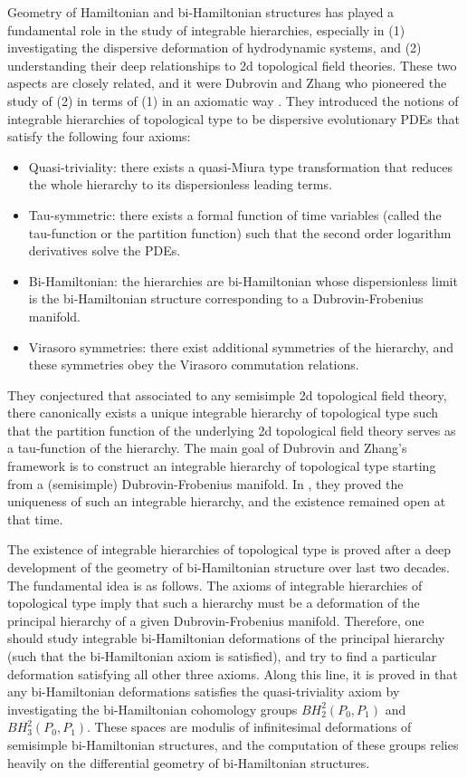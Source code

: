 \documentclass[11pt,a4paper]{amsart}
\numberwithin{equation}{section}
\numberwithin{equation}{section}
\begin{document}
Geometry of Hamiltonian and bi-Hamiltonian structures has played a fundamental role in the study of integrable hierarchies, especially in (1) investigating the dispersive deformation of hydrodynamic systems, and (2) understanding their deep relationships to 2d topological field theories. These two aspects are closely related, and it were Dubrovin and Zhang who pioneered the study of (2) in terms of (1) in an axiomatic way \cite{DZ01}. They introduced the notions of integrable hierarchies of topological type to be dispersive evolutionary PDEs that satisfy the following four axioms:
\begin{itemize}
  \item Quasi-triviality: there exists a quasi-Miura type transformation that reduces the whole hierarchy to its dispersionless leading terms.
  \item Tau-symmetric: there exists a formal function of time variables (called the tau-function or the partition function) such that the second order logarithm derivatives solve the PDEs. 
  \item Bi-Hamiltonian: the hierarchies are bi-Hamiltonian whose dispersionless limit is the bi-Hamiltonian structure corresponding to a Dubrovin-Frobenius manifold.
  \item Virasoro symmetries: there exist additional  symmetries of the hierarchy, and these symmetries obey the Virasoro commutation relations.
\end{itemize}
They conjectured that associated to any semisimple 2d topological field theory, there canonically exists a unique integrable hierarchy of topological type such that the partition function of the underlying 2d topological field theory serves as a tau-function of the hierarchy. The main goal of Dubrovin and Zhang's framework is to construct an integrable hierarchy of topological type starting from a (semisimple) Dubrovin-Frobenius manifold. In \cite{DZ01}, they proved the uniqueness of such an integrable hierarchy, and the existence remained open at that time.

The existence of integrable hierarchies of topological type is proved after a deep development of the geometry of bi-Hamiltonian structure over last two decades. The fundamental idea is as follows. The axioms of integrable hierarchies of topological type imply that such a hierarchy must be a deformation of the principal hierarchy of a given Dubrovin-Frobenius manifold. Therefore, one should study integrable bi-Hamiltonian deformations of the principal hierarchy (such that the bi-Hamiltonian axiom is satisfied),  and try to find a particular deformation satisfying all other three axioms. Along this line, it is proved in \cite{DLZ06} that any bi-Hamiltonian deformations satisfies the quasi-triviality axiom by investigating the bi-Hamiltonian cohomology groups $BH^2_2(P_0,P_1)$ and $BH^2_3(P_0,P_1)$. These spaces are modulis of infinitesimal deformations of semisimple bi-Hamiltonian structures, and the computation of these groups relies heavily on the differential geometry of bi-Hamiltonian structures.
\end{document}
